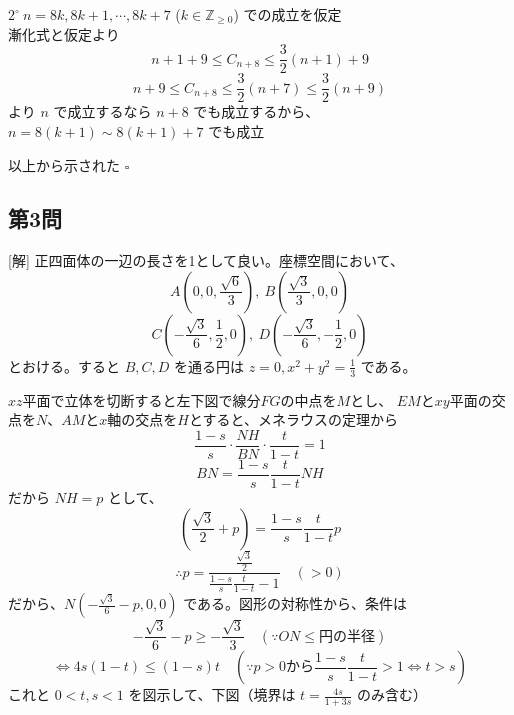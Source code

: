 \documentclass[../main.tex]{subfiles}
\begin{document}
$2^\circ\ n=8k, 8k+1, \cdots, 8k+7$ ($k \in \mathbb{Z}_{\ge 0}$) での成立を仮定\\
漸化式と仮定より
$$n+1+9 \le C_{n+8} \le \frac{3}{2}(n+1)+9$$
$$n+9 \le C_{n+8} \le \frac{3}{2}(n+7) \le \frac{3}{2}(n+9)$$
より $n$ で成立するなら $n+8$ でも成立するから、$n=8(k+1)\sim 8(k+1)+7$ でも成立

以上から示された \quad $\square$

\subsection*{第3問}
[解] 正四面体の一辺の長さを1として良い。座標空間において、
$$A\left(0, 0, \frac{\sqrt{6}}{3}\right),\ B\left(\frac{\sqrt{3}}{3}, 0, 0\right)$$
$$C\left(-\frac{\sqrt{3}}{6}, \frac{1}{2}, 0\right),\ D\left(-\frac{\sqrt{3}}{6}, -\frac{1}{2}, 0\right)$$
とおける。すると $B, C, D$ を通る円は $z=0, x^2+y^2 = \frac{1}{3}$ である。

$xz$平面で立体を切断すると左下図で線分$FG$の中点を$M$とし、
$EM$と$xy$平面の交点を$N$、$AM$と$x$軸の交点を$H$とすると、メネラウスの定理から
$$\frac{1-s}{s} \cdot \frac{NH}{BN} \cdot \frac{t}{1-t} = 1$$
$$BN = \frac{1-s}{s} \frac{t}{1-t} NH$$
だから $NH = p$ として、
$$\left(\frac{\sqrt{3}}{2} + p\right) = \frac{1-s}{s} \frac{t}{1-t} p$$
$$\therefore p = \frac{\frac{\sqrt{3}}{2}}{\frac{1-s}{s}\frac{t}{1-t} - 1} \quad (>0)$$
だから、$N\left(-\frac{\sqrt{3}}{6} - p, 0, 0\right)$ である。図形の対称性から、条件は
$$-\frac{\sqrt{3}}{6} - p \ge -\frac{\sqrt{3}}{3} \quad (\because ON \le \text{円の半径})$$
$$\Leftrightarrow 4s(1-t) \le (1-s)t \quad \left(\because p>0 \text{から} \frac{1-s}{s}\frac{t}{1-t} > 1 \Leftrightarrow t > s\right)$$
これと $0 < t, s < 1$ を図示して、下図（境界は $t = \frac{4s}{1+3s}$ のみ含む）

\vspace{1em}
\vspace{1em}
\end{document}
